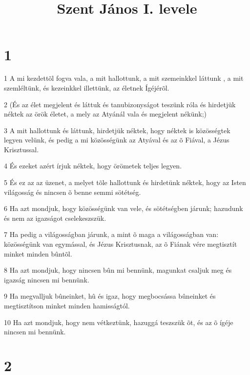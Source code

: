 

\title{Szent János I. levele}


\chapter{1}

\par 1 A mi kezdettõl fogva vala, a mit hallottunk, a mit szemeinkkel láttunk  , a mit szemléltünk, és kezeinkkel illettünk, az életnek Ígéjérõl.
\par 2 (És az élet megjelent és láttuk és tanubizonyságot teszünk róla és hirdetjük néktek az örök  életet, a mely az Atyánál vala és megjelent nékünk;)
\par 3 A mit hallottunk és láttunk, hirdetjük néktek, hogy néktek is közösségtek legyen velünk, és pedig a mi közösségünk az Atyával és az õ Fiával, a Jézus Krisztussal.
\par 4 És ezeket azért írjuk néktek, hogy örömetek teljes legyen.
\par 5 És ez az az üzenet, a melyet tõle hallottunk és hirdetünk néktek, hogy az Isten világosság és nincsen õ benne semmi sötétség.
\par 6 Ha azt mondjuk, hogy közösségünk van vele, és sötétségben járunk; hazudunk és nem az igazságot cselekeszszük.
\par 7 Ha pedig a világosságban járunk, a mint õ maga a világosságban van: közösségünk van egymással, és Jézus Krisztusnak, az õ Fiának vére megtisztít minket minden bûntõl.
\par 8 Ha azt mondjuk, hogy nincsen bûn mi bennünk, magunkat csaljuk meg és igazság nincsen mi bennünk.
\par 9 Ha megvalljuk bûneinket, hû és igaz, hogy megbocsássa bûneinket és megtisztítson minket minden hamisságtól.
\par 10 Ha azt mondjuk, hogy nem vétkeztünk, hazuggá teszszük õt, és az õ ígéje nincsen mi bennünk.

\chapter{2}

